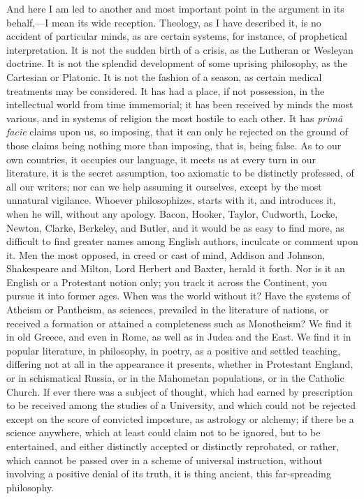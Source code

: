 And here I am led to another and most important point in the
argument in its behalf,—I mean its wide reception. Theology, as I
have described it, is no accident of particular minds, as are certain
systems, for instance, of prophetical interpretation. It is not the
sudden birth of a crisis, as the Lutheran or Wesleyan doctrine. It is
not the splendid development of some uprising philosophy, as the
Cartesian or Platonic. It is not the fashion of a season, as certain
medical treatments may be considered. It has had a place, if not
possession, in the intellectual world from time immemorial; it has
been received by minds the most various, and in systems of religion
the most hostile to each other. It has \emph{primâ facie} claims upon us, so imposing, that it can only be rejected on the ground of
those claims being nothing more than imposing, that is, being false.
As to our own countries, it occupies our language, it meets us at
every turn in our literature, it is the secret assumption, too
axiomatic to be distinctly professed, of all our writers; nor can we
help assuming it ourselves, except by the most unnatural vigilance.
Whoever philosophizes, starts with it, and introduces it, when he
will, without any apology. Bacon, Hooker, Taylor, Cudworth, Locke,
Newton, Clarke, Berkeley, and Butler, and it would be as easy to find
more, as difficult to find greater names among English authors,
inculcate or comment upon it. Men the most opposed, in creed or cast
of mind, Addison and Johnson, Shakespeare and Milton, Lord Herbert and
Baxter, herald it forth. Nor is it an English or a Protestant notion
only; you track it across the Continent, you pursue it into former
ages. When was the world without it? Have the systems of Atheism or
Pantheism, as sciences, prevailed in the literature of nations, or
received a formation or attained a completeness such as Monotheism? We
find it in old Greece, and even in Rome, as well as in Judea and the
East. We find it in popular literature, in philosophy, in poetry, as a
positive and settled teaching, differing not at all in the appearance
it presents, whether in Protestant England, or in schismatical Russia,
or in the Mahometan populations, or in the Catholic Church. If ever
there was a subject of thought, which had earned by prescription to be
received among the studies of a University, and which could not be
rejected except on the score of convicted imposture, as astrology or
alchemy; if there be a science anywhere, which at least could claim
not to be ignored, but to be entertained, and either distinctly
accepted or distinctly reprobated, or rather, which cannot be
passed over in a scheme of universal instruction, without involving a
positive denial of its truth, it is thing ancient, this far-spreading
philosophy.

